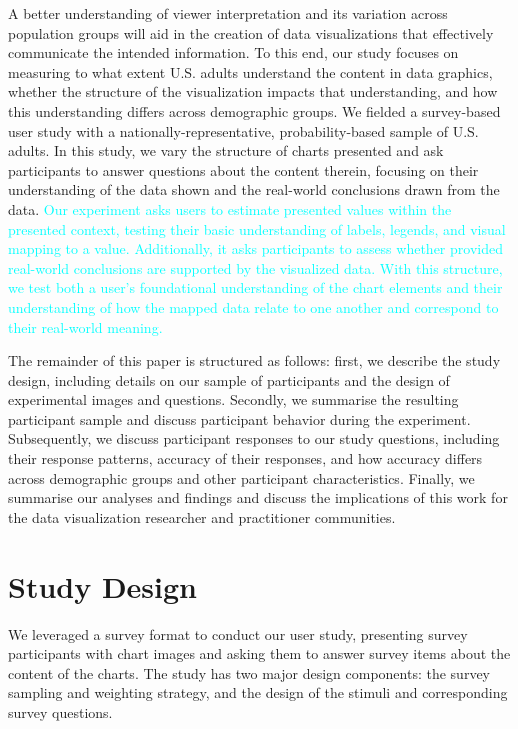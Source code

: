 \documentclass{IEEEcsmag}
\begin{document}
A better understanding of viewer interpretation and its variation across population groups will aid in the creation of data visualizations that effectively communicate the intended information. To this end, our study focuses on measuring to what extent U.S. adults understand the content in data graphics, whether the structure of the visualization impacts that understanding, and how this understanding differs across demographic groups. We fielded a survey-based user study with a nationally-representative, probability-based sample of U.S. adults. In this study, we vary the structure of charts presented and ask participants to answer questions about the content therein, focusing on their understanding of the data shown and the real-world conclusions drawn from the data. \textcolor{cyan}{Our experiment asks users to estimate presented values within the presented context, testing their basic understanding of labels, legends, and visual mapping to a value. Additionally, it asks participants to assess whether provided real-world conclusions are supported by the visualized data. With this structure, we test both a user's foundational understanding of the chart elements and their understanding of how the mapped data relate to one another and correspond to their real-world meaning. }

The remainder of this paper is structured as follows: first, we describe the study design, including details on our sample of participants and the design of experimental images and questions. Secondly, we summarise the resulting participant sample and discuss participant behavior during the experiment. Subsequently, we discuss participant responses to our study questions, including their response patterns, accuracy of their responses, and how accuracy differs across demographic groups and other participant characteristics. Finally, we summarise our analyses and findings and discuss the implications of this work for the data visualization researcher and practitioner communities.

\section{Study Design}\label{design}

We leveraged a survey format to conduct our user study, presenting survey participants with chart images and asking them to answer survey items about the content of the charts. The study has two major design components: the survey sampling and weighting strategy, and the design of the stimuli and corresponding survey questions.
\end{document}
